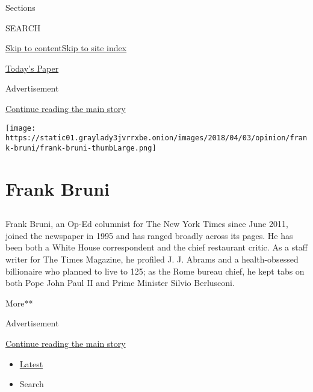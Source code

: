 Sections

SEARCH

\protect\hyperlink{site-content}{Skip to
content}\protect\hyperlink{site-index}{Skip to site index}

\href{https://myaccount.nytimes3xbfgragh.onion/auth/login?response_type=cookie\&client_id=vi}{}

\href{https://www.nytimes3xbfgragh.onion/section/todayspaper}{Today's
Paper}

Advertisement

\protect\hyperlink{after-top}{Continue reading the main story}

\texttt{[image: https://static01.graylady3jvrrxbe.onion/images/2018/04/03/opinion/frank-bruni/frank-bruni-thumbLarge.png]}

\hypertarget{frank-bruni}{%
\section{Frank Bruni}\label{frank-bruni}}

\subsection{}

Frank Bruni, an Op-Ed columnist for The New York Times since June 2011,
joined the newspaper in 1995 and has ranged broadly across its pages. He
has been both a White House correspondent and the chief restaurant
critic. As a staff writer for The Times Magazine, he profiled J. J.
Abrams and a health-obsessed billionaire who planned to live to 125; as
the Rome bureau chief, he kept tabs on both Pope John Paul II and Prime
Minister Silvio Berlusconi.

More**

Advertisement

\protect\hyperlink{after-mid1}{Continue reading the main story}

\begin{itemize}
\tightlist
\item
  \protect\hyperlink{stream-panel}{Latest}
\item
  Search
\end{itemize}

